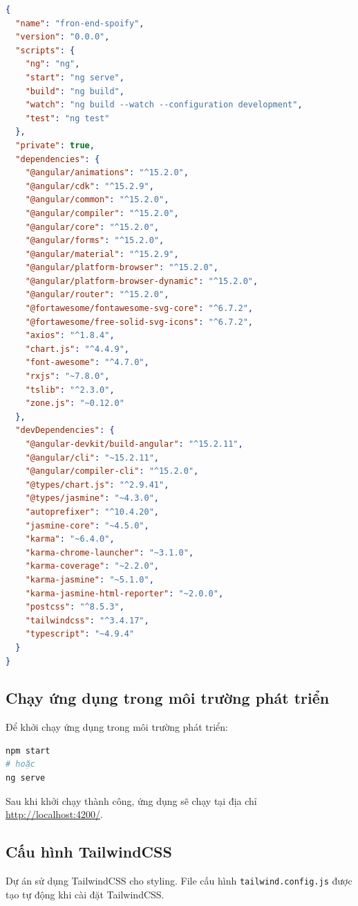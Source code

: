 \begin{lstlisting}[language=json]
{
  "name": "fron-end-spoify",
  "version": "0.0.0",
  "scripts": {
    "ng": "ng",
    "start": "ng serve",
    "build": "ng build",
    "watch": "ng build --watch --configuration development",
    "test": "ng test"
  },
  "private": true,
  "dependencies": {
    "@angular/animations": "^15.2.0",
    "@angular/cdk": "^15.2.9",
    "@angular/common": "^15.2.0",
    "@angular/compiler": "^15.2.0",
    "@angular/core": "^15.2.0",
    "@angular/forms": "^15.2.0",
    "@angular/material": "^15.2.9",
    "@angular/platform-browser": "^15.2.0",
    "@angular/platform-browser-dynamic": "^15.2.0",
    "@angular/router": "^15.2.0",
    "@fortawesome/fontawesome-svg-core": "^6.7.2",
    "@fortawesome/free-solid-svg-icons": "^6.7.2",
    "axios": "^1.8.4",
    "chart.js": "^4.4.9",
    "font-awesome": "^4.7.0",
    "rxjs": "~7.8.0",
    "tslib": "^2.3.0",
    "zone.js": "~0.12.0"
  },
  "devDependencies": {
    "@angular-devkit/build-angular": "^15.2.11",
    "@angular/cli": "~15.2.11",
    "@angular/compiler-cli": "^15.2.0",
    "@types/chart.js": "^2.9.41",
    "@types/jasmine": "~4.3.0",
    "autoprefixer": "^10.4.20",
    "jasmine-core": "~4.5.0",
    "karma": "~6.4.0",
    "karma-chrome-launcher": "~3.1.0",
    "karma-coverage": "~2.2.0",
    "karma-jasmine": "~5.1.0",
    "karma-jasmine-html-reporter": "~2.0.0",
    "postcss": "^8.5.3",
    "tailwindcss": "^3.4.17",
    "typescript": "~4.9.4"
  }
}
\end{lstlisting}

\subsection{Chạy ứng dụng trong môi trường phát triển}

Để khởi chạy ứng dụng trong môi trường phát triển:

\begin{lstlisting}[language=bash]
npm start
# hoặc
ng serve
\end{lstlisting}

Sau khi khởi chạy thành công, ứng dụng sẽ chạy tại địa chỉ \url{http://localhost:4200/}.

\subsection{Cấu hình TailwindCSS}

Dự án sử dụng TailwindCSS cho styling. File cấu hình \texttt{tailwind.config.js} được tạo tự động khi cài đặt TailwindCSS.

